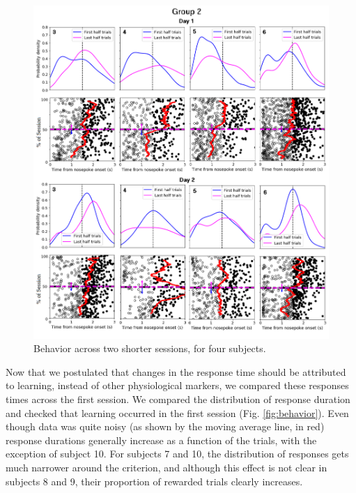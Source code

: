     \begin{figure}
        \centering
        \includegraphics[width=\textwidth]{figures/grupo2.png}
        \caption[Behavior across two sessions]{Behavior across two shorter sessions, for four subjects.}
        \label{fig:behavior2}
    \end{figure} 


Now that we postulated that changes in the response time should be attributed to learning, instead of other physiological markers, we compared these responses times across the first session. We compared the distribution of response duration and checked that learning occurred in the first session (Fig. \ref{fig:behavior}). Even though data was quite noisy (as shown by the moving average line, in red) response durations generally increase as a function of the trials, with the exception of subject 10. For subjects 7 and 10, the distribution of responses gets much narrower around the criterion, and although this effect is not clear in subjects 8 and 9, their proportion of rewarded trials clearly increases. %
